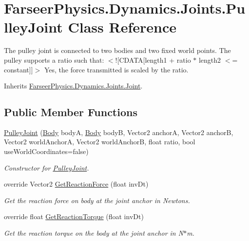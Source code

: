 \hypertarget{class_farseer_physics_1_1_dynamics_1_1_joints_1_1_pulley_joint}{\section{Farseer\+Physics.\+Dynamics.\+Joints.\+Pulley\+Joint Class Reference}
\label{class_farseer_physics_1_1_dynamics_1_1_joints_1_1_pulley_joint}
}


The pulley joint is connected to two bodies and two fixed world points. The pulley supports a ratio such that\+: $<$!\mbox{[}C\+D\+A\+T\+A\mbox{[}length1 + ratio $\ast$ length2 $<$= constant\mbox{]}\mbox{]}$>$ Yes, the force transmitted is scaled by the ratio.  




Inherits \hyperlink{class_farseer_physics_1_1_dynamics_1_1_joints_1_1_joint}{Farseer\+Physics.\+Dynamics.\+Joints.\+Joint}.

\subsection*{Public Member Functions}
\begin{DoxyCompactItemize}
\item 
\hyperlink{class_farseer_physics_1_1_dynamics_1_1_joints_1_1_pulley_joint_a6206b117febaeb6c577e201decf29d3e}{Pulley\+Joint} (\hyperlink{class_farseer_physics_1_1_dynamics_1_1_body}{Body} body\+A, \hyperlink{class_farseer_physics_1_1_dynamics_1_1_body}{Body} body\+B, Vector2 anchor\+A, Vector2 anchor\+B, Vector2 world\+Anchor\+A, Vector2 world\+Anchor\+B, float ratio, bool use\+World\+Coordinates=false)
\begin{DoxyCompactList}\small\item\em Constructor for \hyperlink{class_farseer_physics_1_1_dynamics_1_1_joints_1_1_pulley_joint}{Pulley\+Joint}. \end{DoxyCompactList}\item 
override Vector2 \hyperlink{class_farseer_physics_1_1_dynamics_1_1_joints_1_1_pulley_joint_a8448102d0e2e2f9c4d58c6d10aaadbba}{Get\+Reaction\+Force} (float inv\+Dt)
\begin{DoxyCompactList}\small\item\em Get the reaction force on body at the joint anchor in Newtons. \end{DoxyCompactList}\item 
override float \hyperlink{class_farseer_physics_1_1_dynamics_1_1_joints_1_1_pulley_joint_a5b434934bbbddf36c29ca47a699e1315}{Get\+Reaction\+Torque} (float inv\+Dt)
\begin{DoxyCompactList}\small\item\em Get the reaction torque on the body at the joint anchor in N$\ast$m. \end{DoxyCompactList}\end{DoxyCompactItemize}
